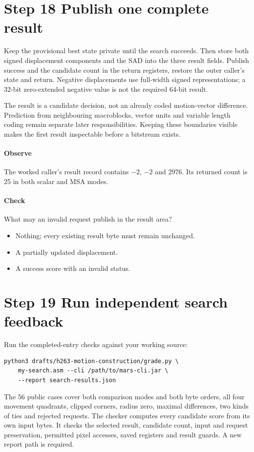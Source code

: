 \section{Step 18 Publish one complete result}\label{h263-motion-s08}
Keep the provisional best state private until the search succeeds. Then store
both signed displacement components and the SAD into the three result fields.
Publish success and the candidate count in the return registers, restore the
outer caller's state and return. Negative displacements use full-width signed
representations; a 32-bit zero-extended negative value is not the required
64-bit result.

The result is a candidate decision, not an already coded motion-vector
difference. Prediction from neighbouring macroblocks, vector units and variable
length coding remain separate later responsibilities. Keeping these boundaries
visible makes the first result inspectable before a bitstream exists.

\paragraph{Observe} The worked caller's result record contains $-2$, $-2$ and
2976. Its returned count is 25 in both scalar and MSA modes.
\paragraph{Check} What may an invalid request publish in the result area?
\begin{itemize}
  \item[A.] Nothing; every existing result byte must remain unchanged.
  \item[B.] A partially updated displacement.
  \item[C.] A success score with an invalid status.
\end{itemize}

\section{Step 19 Run independent search feedback}\label{h263-motion-s09}
Run the completed-entry checks against your working source:
\begin{verbatim}
python3 drafts/h263-motion-construction/grade.py \
    my-search.asm --cli /path/to/mars-cli.jar \
    --report search-results.json
\end{verbatim}
The 56 public cases cover both comparison modes and both byte orders, all four
movement quadrants, clipped corners, radius zero, maximal differences, two kinds
of ties and rejected requests. The checker computes every candidate score from
its own input bytes. It checks the selected result, candidate count, input and
request preservation, permitted pixel accesses, saved registers and result guards.
A new report path is required.

